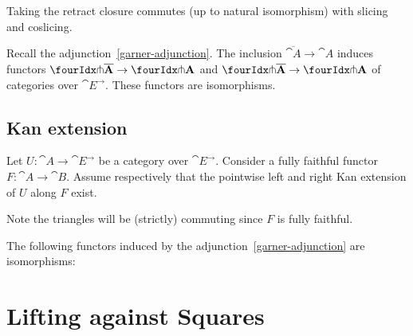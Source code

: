 \documentclass[reqno,10pt,a4paper,oneside]{amsart}
\begin{document}
\begin{remark}
\label{retract-closure-slicing}
Taking the retract closure commutes (up to natural isomorphism) with slicing and coslicing.
\end{remark}

\begin{lemma}
\label{retract-closure}
Recall the adjunction~\eqref{garner-adjunction}.
The inclusion $\overline{\cat{A}} \to \cat{A}$ induces functors $\liftl{\overline{\cat{A}}} \to \liftl{\cat{A}}$ and $\liftr{\overline{\cat{A}}} \to \liftr{\cat{A}}$ of categories over $\cat{E}^{\to}$.
These functors are isomorphisms.
\end{lemma}

\subsection{Kan extension}

Let $U : \cat{A} \to \cat{E}^{\to}$ be a category over $\cat{E}^{\to}$.
Consider a fully faithful functor $F : \cat{A} \to \cat{B}$.
Assume respectively that the pointwise left and right Kan extension of $U$ along $F$ exist.
Note the triangles will be (strictly) commuting since $F$ is fully faithful.

\begin{lemma}
\label{kan-extension-closure}
The following functors induced by the adjunction~\eqref{garner-adjunction} are isomorphisms:
\end{lemma}

\section{Lifting against Squares}
\end{document}
